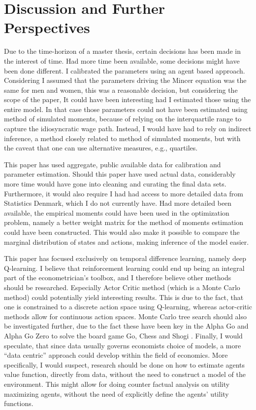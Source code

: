 \section{Discussion and Further Perspectives}

Due to the time-horizon of a master thesis, certain decisions has been made in the interest of time. Had more time been available, some decisions might have been done different. I calibrated the parameters using an agent based approach. Considering I assumed that the parameters driving the Mincer equation was the same for men and women, this was a reasonable decision, but considering the scope of the paper, It could have been interesting had I estimated those using the entire model. In that case those parameters could not have been estimated using method of simulated moments, because of relying on the interquartile range to capture the idiosyncratic wage path. Instead, I would have had to rely on indirect inference, a method closely related to method of simulated moments, but with the caveat that one can use alternative measures, e.g., quartiles.

This paper has used aggregate, public available data for calibration and parameter estimation. Should this paper have used actual data, considerably more time would have gone into cleaning and curating the final data sets. Furthermore, it would also require I had had access to more detailed data from Statistics Denmark, which I do not currently have. Had more detailed been available, the empirical moments could have been used in the optimization problem, namely a better weight matrix for the method of moments estimation could have been constructed. This would also make it possible to compare the marginal distribution of states and actions, making inference of the model easier.

This paper has focused exclusively on temporal difference learning, namely deep Q-learning. I believe that reinforcement learning could end up being an integral part of the econometrician's toolbox, and I therefore believe other methods should be researched. Especially Actor Critic method (which is a Monte Carlo method) could potentially yield interesting results. This is due to the fact, that one is constrained to a discrete action space using Q-learning, whereas actor-critic methods allow for continuous action spaces. Monte Carlo tree search should also be investigated further, due to the fact these have been key in the Alpha Go and Alpha Go Zero to solve the board game Go, Chess and Shogi \parencite{silver_general_2018}. Finally, I would speculate, that since data usually governs economists choice of models, a more ``data centric'' approach could develop within the field of economics. More specifically, I would suspect, research should be done on how to estimate agents value function, directly from data, without the need to construct a model of the environment. This might allow for doing counter factual analysis on utility maximizing agents, without the need of explicitly define the agents' utility functions.

